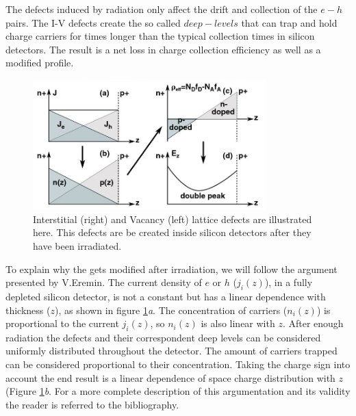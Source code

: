 
The defects induced by radiation only affect the drift and collection of the $e-h$ pairs. The I-V defects create the so called $deep-levels$ that can trap and hold charge carriers for times longer than the typical collection times in silicon detectors. The result is a net loss in charge collection efficiency as well as a modified \neff profile.

\begin{figure}[H]
	\centering
	\includegraphics[width=0.8\textwidth]{chap3_erem.jpg}
	\caption{Interstitial (right) and Vacancy (left) lattice defects are illustrated here. This defects are be created inside silicon detectors after they have been irradiated.}
	\label{fig:Eremin}
\end{figure}

To explain why the \neff gets modified after irradiation, we will follow the argument presented by V.Eremin\cite{Eremin}. The current density of $e$ or $h$ ($j_i(z)$), in a fully depleted silicon detector, is not a constant but has a linear dependence with thickness ($z$), as shown  in figure \ref{fig:Eremin}\emph{a}. The concentration of carriers ($n_i(z)$) is proportional to the current $j_i(z)$, so $n_i(z)$ is also linear with $z$. After enough radiation the defects and their correspondent deep levels can be considered uniformly distributed throughout the detector. The amount of carriers trapped can be considered proportional to their concentration. Taking the charge sign into account the end result is a linear dependence of space charge distribution with $z$ (Figure \ref{fig:Eremin}\emph{b}. For a more complete description of this argumentation and its validity the reader is referred to the bibliography.


